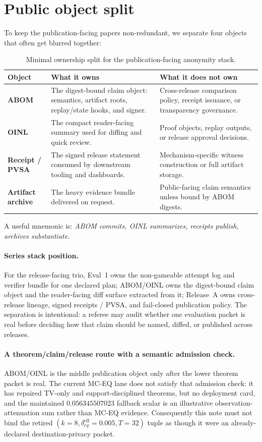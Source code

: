 \documentclass[11pt]{article}
\begin{document}
\section{Public object split}
To keep the publication-facing papers non-redundant, we separate four objects that often get blurred together:
\begin{table}[t]
\centering
\small
\begin{tabular}{@{}p{2.3cm}p{4.7cm}p{4.9cm}@{}}
\toprule
\textbf{Object} & \textbf{What it owns} & \textbf{What it does not own}\\
\midrule
\textbf{ABOM} & The digest-bound claim object: semantics, artifact roots, replay/state hooks, and signer. & Cross-release comparison policy, receipt issuance, or transparency governance.\\
\addlinespace
\textbf{OINL} & The compact reader-facing summary used for diffing and quick review. & Proof objects, replay outputs, or release approval decisions.\\
\addlinespace
\textbf{Receipt / PVSA} & The signed release statement consumed by downstream tooling and dashboards. & Mechanism-specific witness construction or full artifact storage.\\
\addlinespace
\textbf{Artifact archive} & The heavy evidence bundle delivered on request. & Public-facing claim semantics unless bound by ABOM digests.\\
\bottomrule
\end{tabular}
\caption{Minimal ownership split for the publication-facing anonymity stack.}
\label{tab:object-split}
\end{table}
A useful mnemonic is: \emph{ABOM commits, OINL summarizes, receipts publish, archives substantiate}.

\paragraph{Series stack position.}
For the release-facing trio, Eval~1 owns the non-gameable attempt log and verifier bundle for one declared plan; ABOM/OINL owns the digest-bound claim object and the reader-facing diff surface extracted from it; Release~A owns cross-release lineage, signed receipts / PVSA, and fail-closed publication policy.\cite{series:evalnotary,series:releaseproperty}
The separation is intentional: a referee may audit whether one evaluation packet is real before deciding how that claim should be named, diffed, or published across releases.


\paragraph{A theorem/claim/release route with a semantic admission check.}
ABOM/OINL is the middle publication object only after the lower theorem packet is real.  The current MC-EQ lane does not satisfy that admission check: it has repaired TV-only and support-disciplined theorems, but no deployment card, and the maintained $0.056345507023$ fallback scalar is an illustrative observation-attenuation sum rather than MC-EQ evidence.  Consequently this note must not bind the retired $(k=8,\delta_{eq}^{\mathrm{eff}}=0.005,T=32)$ tuple as though it were an already-declared destination-privacy packet.
\end{document}
